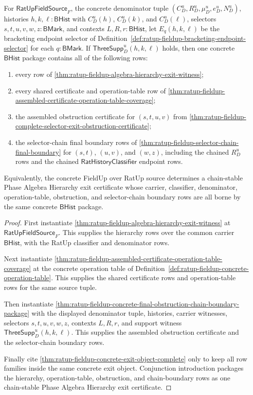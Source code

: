 \begin{theorem}
\label{thm:ratup-fieldup-algebra-hierarchy-chain-stable-exit}
For $\mathsf{RatUpFieldSource}_F$, the concrete denominator tuple
$(C_D^u,R_D^u,\mu_D^u,e_D^u,N_D^u)$, histories
$h,k,\ell:\mathsf{BHist}$ with $C_D^u(h)$, $C_D^u(k)$, and $C_D^u(\ell)$,
selectors $s,t,u,v,w,z:\mathsf{BMark}$, and contexts
$L,R,r:\mathsf{BHist}$, let $E_q(h,k,\ell)$ be the bracketing endpoint selector
of Definition~\ref{def:ratup-fieldup-bracketing-endpoint-selector} for each
$q:\mathsf{BMark}$. If $\mathsf{ThreeSupp}_D^u(h,k,\ell)$ holds, then one
concrete $\mathsf{BHist}$ package contains all of the following rows:
\begin{enumerate}
  \item every row of
  \autoref{thm:ratup-fieldup-algebra-hierarchy-exit-witness};
  \item every shared certificate and operation-table row of
  \autoref{thm:ratup-fieldup-assembled-certificate-operation-table-coverage};
  \item the assembled obstruction certificate for $(s,t,u,v)$ from
  \autoref{thm:ratup-fieldup-complete-selector-exit-obstruction-certificate};
  \item the selector-chain final boundary rows of
  \autoref{thm:ratup-fieldup-selector-chain-final-boundary} for $(s,t)$,
  $(u,v)$, and $(w,z)$, including the chained $R_D^u$ rows and the chained
  $\mathsf{RatHistoryClassifier}$ endpoint rows.
\end{enumerate}
Equivalently, the concrete FieldUp over RatUp source determines a
chain-stable Phase Algebra Hierarchy exit certificate whose carrier,
classifier, denominator, operation-table, obstruction, and selector-chain
boundary rows are all borne by the same concrete $\mathsf{BHist}$ package.
\end{theorem}
\begin{proof}
First instantiate
\autoref{thm:ratup-fieldup-algebra-hierarchy-exit-witness} at
$\mathsf{RatUpFieldSource}_F$. This supplies the hierarchy rows over the common
carrier $\mathsf{BHist}$, with the RatUp classifier and denominator rows.

Next instantiate
\autoref{thm:ratup-fieldup-assembled-certificate-operation-table-coverage} at
the concrete operation table of
Definition~\ref{def:ratup-fieldup-concrete-operation-table}. This supplies the
shared certificate rows and operation-table rows for the same source tuple.

Then instantiate
\autoref{thm:ratup-fieldup-concrete-final-obstruction-chain-boundary-package}
with the displayed denominator tuple, histories, carrier witnesses, selectors
$s,t,u,v,w,z$, contexts $L,R,r$, and support witness
$\mathsf{ThreeSupp}_D^u(h,k,\ell)$. This supplies the assembled obstruction
certificate and the selector-chain boundary rows.

Finally cite \autoref{thm:ratup-fieldup-concrete-exit-object-complete} only to
keep all row families inside the same concrete exit object. Conjunction
introduction packages the hierarchy, operation-table, obstruction, and
chain-boundary rows as one chain-stable Phase Algebra Hierarchy exit
certificate.
\end{proof}


